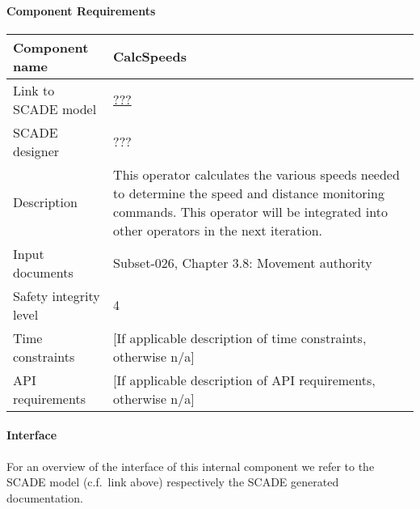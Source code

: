 
\paragraph{Component Requirements}

\begin{longtable}{p{}p{}}
\toprule
Component name			& CalcSpeeds \\
\midrule
Link to SCADE model		& {\footnotesize \url{???}} \\
\midrule
SCADE designer			& ??? \\
\midrule
Description				& This operator calculates the various speeds needed to determine the speed and distance monitoring commands. This operator will be integrated into other operators in the next iteration.\\
\midrule
Input documents	& 
Subset-026, Chapter 3.8: Movement authority \\
\midrule
Safety integrity level		& 4 \\
\midrule
Time constraints		& [If applicable description of time constraints, otherwise n/a] \\
\midrule
API requirements 		& [If applicable description of API requirements, otherwise n/a] \\
\bottomrule
\end{longtable}


\paragraph{Interface}

For an overview of the interface of this internal component we refer to the SCADE model (c.f.~link above) respectively the SCADE generated documentation.